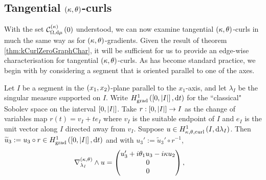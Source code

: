 \subsection{Tangential $\left( \kappa, \theta \right)$-curls} \label{sec:ktCurlsTangential}
With the set $\mathcal{C}_{ \Omega, \mathrm{d}\mu}^{(\kappa)}\left( 0 \right)$ understood, we can now examine tangential $\left( \kappa, \theta \right)$-curls in much the same way as for $\left( \kappa, \theta \right)$-gradients.
Given the result of theorem \ref{thm:kCurlZeroGraphChar}, it will be sufficient for us to provide an edge-wise characterisation for tangential $\left( \kappa, \theta \right)$-curls.
As has become standard practice, we begin with by considering a segment that is oriented parallel to one of the axes.
\begin{lemma} \label{lem:ktTanCurlSegmentParallel}
	Let $I$ be a segment in the $\left( x_1,x_2 \right)$-plane parallel to the $x_1$-axis, and let $\lambda_I$ be the singular measure supported on $I$.
	Write $H^1_\mathrm{grad}\left( \left[ 0,\left\lvert I \right\rvert \right], \mathrm{d}t \right)$ for the ``classical" Sobolev space on the interval $\left[ 0,\left\lvert I \right\rvert \right]$.
	Take $r:\left[ 0,\left\lvert I \right\rvert \right]\rightarrow I$ as the change of variables map $r(t) = v_I + te_I$ where $v_I$ is the suitable endpoint of $I$ and $e_I$ is the unit vector along $I$ directed away from $v_I$.
	Suppose $u\in H^1_{\kappa,\theta,\mathrm{curl}}\left( I, \mathrm{d}\lambda_I \right)$.
	Then $\widetilde{u}_3 := u_3 \circ r \in H^1_\mathrm{grad}\left( \left[ 0,\left\lvert I \right\rvert \right], \mathrm{d}t \right)$ and with $u_3' := \widetilde{u}_3' \circ r^{-1}$,
	\begin{align*}
		\nabla_{\lambda_I}^{\left( \kappa, \theta \right)}\wedge u &= 
		\begin{pmatrix} u_3' + i\theta_1 u_3 - i\kappa u_2 \\ 0 \\ 0 \end{pmatrix},
	\end{align*}
\end{lemma}
